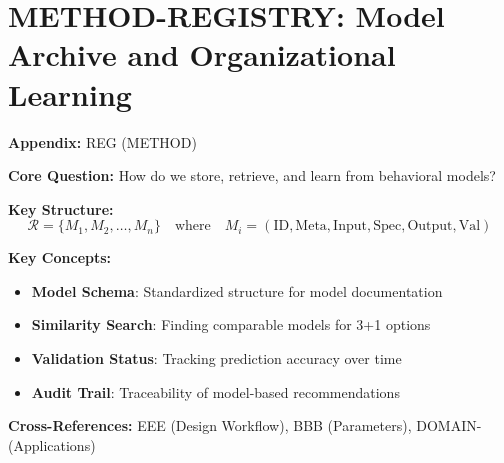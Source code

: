 \chapter{METHOD-REGISTRY: Model Archive and Organizational Learning}
\label{app:method-registry}

\begin{abstract}
This appendix defines the Model Registry---a structured archive storing all
behavioral models designed from the Evidence-Based Framework (EBF). The Registry
serves three functions: (1) enabling the 3+1 Choice Architecture through
similarity search, (2) maintaining audit trails for model-based recommendations,
and (3) facilitating organizational learning across projects. The Registry schema
captures model metadata, inputs, specifications, outputs, and validation status.
\end{abstract}

\begin{tcolorbox}[colback=blue!5!white, colframe=blue!75!black,
    title=Quick Reference: Model Registry]
\textbf{Appendix:} REG (METHOD)


\textbf{Core Question:} How do we store, retrieve, and learn from behavioral models?

\textbf{Key Structure:}
\begin{equation}
\mathcal{R} = \{M_1, M_2, \ldots, M_n\} \quad \text{where} \quad M_i = (\text{ID}, \text{Meta}, \text{Input}, \text{Spec}, \text{Output}, \text{Val})
\end{equation}

\textbf{Key Concepts:}
\begin{itemize}[nosep]
\item \textbf{Model Schema}: Standardized structure for model documentation
\item \textbf{Similarity Search}: Finding comparable models for 3+1 options
\item \textbf{Validation Status}: Tracking prediction accuracy over time
\item \textbf{Audit Trail}: Traceability of model-based recommendations
\end{itemize}

\textbf{Cross-References:} EEE (Design Workflow), BBB (Parameters), DOMAIN- (Applications)
\end{tcolorbox}


